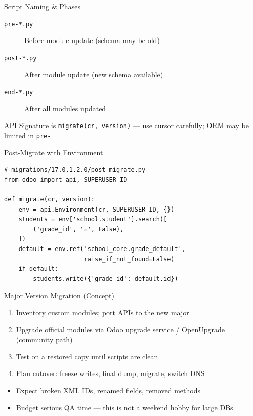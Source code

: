 \begin{frame}{Script Naming \& Phases}
\begin{description}
  \item[\texttt{pre-*.py}] Before module update (schema may be old)
  \item[\texttt{post-*.py}] After module update (new schema available)
  \item[\texttt{end-*.py}] After all modules updated
\end{description}

\vspace{0.5em}
\begin{alertblock}{API}
  Signature is \texttt{migrate(cr, version)} --- use cursor carefully; ORM may be limited in \texttt{pre-}.
\end{alertblock}
\end{frame}

\begin{frame}[fragile]{Post-Migrate with Environment}
\begin{lstlisting}
# migrations/17.0.1.2.0/post-migrate.py
from odoo import api, SUPERUSER_ID

def migrate(cr, version):
    env = api.Environment(cr, SUPERUSER_ID, {})
    students = env['school.student'].search([
        ('grade_id', '=', False),
    ])
    default = env.ref('school_core.grade_default',
                      raise_if_not_found=False)
    if default:
        students.write({'grade_id': default.id})
\end{lstlisting}
\end{frame}

\begin{frame}{Major Version Migration (Concept)}
\begin{enumerate}
  \item Inventory custom modules; port APIs to the new major
  \item Upgrade official modules via Odoo upgrade service / OpenUpgrade (community path)
  \item Test on a restored copy until scripts are clean
  \item Plan cutover: freeze writes, final dump, migrate, switch DNS
\end{enumerate}

\vspace{0.5em}
\begin{itemize}
  \item Expect broken XML IDs, renamed fields, removed methods
  \item Budget serious QA time --- this is not a weekend hobby for large DBs
\end{itemize}
\end{frame}

